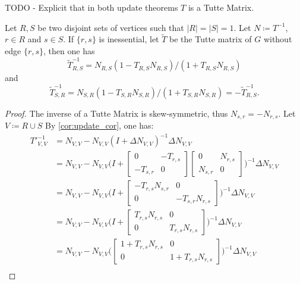 TODO - Explicit that in both update theorems \(T\) is a Tutte Matrix.

\begin{theorem}[Update 1]
\label{update:1}
    Let \(R, S\) be two disjoint sets of vertices such that \(|R| = |S| = 1\).
    Let \(N \coloneqq T^{-1}\), \(r \in R\) and \(s \in S\).
    If \(\{r, s\}\) is inessential, let \(\tilde{T}\) be the Tutte matrix of \(G\) without edge \(\{r, s\}\), then one has
    \[
        \tilde{T}^{-1}_{R, S} = N_{R, S} (1 - T_{R, S} N_{R, S}) / (1 + T_{R, S} N_{R, S})
    \]
    and
    \[
        \tilde{T}^{-1}_{S, R} = N_{S, R} (1 - T_{S, R} N_{S, R}) / (1 + T_{S, R} N_{S, R}) = -\tilde{T}^{-1}_{R, S}.
    \]
\end{theorem}

\begin{proof}
    The inverse of a Tutte Matrix is skew-symmetric, thus \(N_{s, r} = -N_{r, s}\).
    Let \(V \coloneqq R \cup S\)
    By \cref{cor:update_cor}, one has:
    \begin{align*}
        {T'}^{-1}_{V, V} &= N_{V, V} - N_{V, V} (I + \Delta N_{V, V})^{-1} \Delta N_{V, V} \\
        &= N_{V, V} - N_{V, V} \bigg(I + \begin{bmatrix} 0 & -T_{r, s} \\ -T_{s, r} & 0 \end{bmatrix} \begin{bmatrix} 0 & N_{r, s} \\ N_{s, r} & 0 \end{bmatrix}\bigg)^{-1} \Delta N_{V, V} \\
        &= N_{V, V} - N_{V, V} \bigg(I + \begin{bmatrix} -T_{r, s} N_{s, r} & 0 \\ 0 & -T_{s, r} N_{r, s} \end{bmatrix} \bigg)^{-1} \Delta N_{V, V} \\
        &= N_{V, V} - N_{V, V} \bigg(I + \begin{bmatrix} T_{r, s} N_{r, s} & 0 \\ 0 & T_{r, s} N_{r, s} \end{bmatrix} \bigg)^{-1} \Delta N_{V, V} \\
        &= N_{V, V} - N_{V, V} \bigg(\begin{bmatrix} 1 + T_{r, s} N_{r, s} & 0 \\ 0 & 1 + T_{r, s} N_{r, s} \end{bmatrix} \bigg)^{-1} \Delta N_{V, V} \\

\end{align*}
\end{proof}
